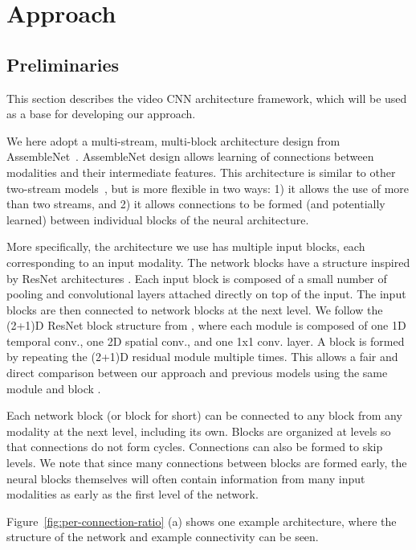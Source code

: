 \documentclass[runningheads]{llncs}
\begin{document}
\section{Approach}

\subsection{Preliminaries}


This section describes the video CNN architecture framework, which will be used as a base for developing our approach.

We here adopt a multi-stream, multi-block architecture design from AssembleNet~\cite{ryoo2019assemblenet}. AssembleNet design allows learning of connections between modalities and their intermediate features. This architecture is similar to other two-stream models~\cite{carreira2017quo,feichtenhofer2018slowfast}, but is more flexible in two ways: 1) it allows the use of more than two streams, and 2) it allows connections to be formed (and potentially learned) between individual blocks of the neural architecture.

More specifically, the architecture we use has multiple input blocks, each corresponding to an input modality. The network blocks have a structure inspired by ResNet architectures \cite{resnet}. Each input block is composed of a small number of pooling and convolutional layers attached directly on top of the input. 
The input blocks are then connected to network blocks at the next level. 
We follow the (2+1)D ResNet block structure from \cite{tran2018closer}, where each module is composed of one 1D temporal conv., one 2D spatial conv., and one 1x1 conv. layer. A block is formed by repeating the (2+1)D residual module multiple times. This allows a fair and direct comparison between our approach and previous models using the same module and block \cite{tran2018closer,feichtenhofer2018slowfast,ryoo2019assemblenet}.


Each network block (or block for short) can be connected to any block from any modality at the next level, including its own. 
Blocks are organized at levels so that connections do not form cycles.
Connections can also be formed to skip levels.
We note that since many connections between blocks are formed early, the neural blocks themselves will often contain information from many input modalities as early as the first level of the network.

Figure~\ref{fig:per-connection-ratio} (a) shows one example architecture, where the structure of the network and example connectivity can be seen.
\end{document}
